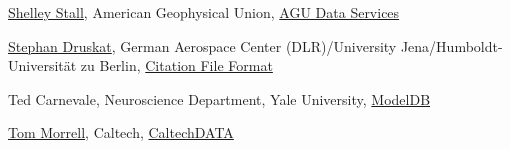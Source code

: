 \documentclass[11pt]{article}
\begin{document}
\begin{spacing}{0.86}
\href{https://orcid.org/0000-0003-2926-8353}{Shelley Stall}, American Geophysical Union, \href{https://www.agu.org/Learn-About-AGU/About-AGU/Data-Leadership}{AGU Data Services}

\href{https://orcid.org/0000-0003-4925-7248}{Stephan Druskat}, German Aerospace Center (DLR)/University
Jena/Humboldt-Universität zu Berlin, \href{https://citation-file-format.github.io/}{Citation File Format}

Ted Carnevale, Neuroscience Department, Yale University, \href{https://senselab.med.yale.edu/modeldb/}{ModelDB}

\href{https://orcid.org/0000-0001-9266-5146}{Tom Morrell}, Caltech, \href{https://data.caltech.edu/}{CaltechDATA}

\end{spacing}
\end{document}
